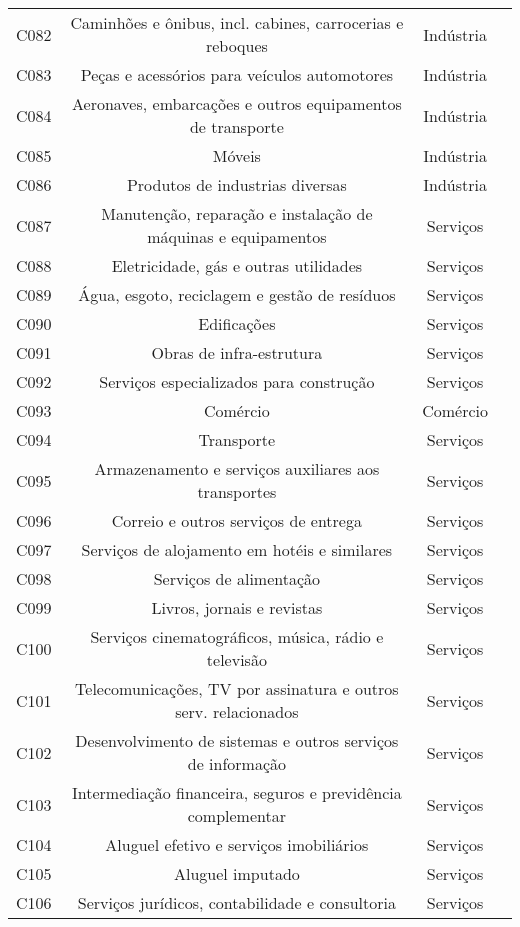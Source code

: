\begin{apendicesenv}
\begin{small}
\begin{center}
\begin{longtable}{lccc}
				C082 & Caminhões e ônibus, incl. cabines, carrocerias e reboques & Indústria \\
				C083 & Peças e acessórios para veículos automotores & Indústria \\
				C084 & Aeronaves, embarcações e outros equipamentos de transporte & Indústria \\
				C085 & Móveis & Indústria \\
				C086 & Produtos de industrias diversas & Indústria \\
				C087 & Manutenção, reparação e instalação de máquinas e equipamentos & Serviços \\
				C088 & Eletricidade, gás e outras utilidades & Serviços \\
				C089 & Água, esgoto, reciclagem e gestão de resíduos & Serviços \\
				C090 & Edificações & Serviços \\
				C091 & Obras de infra-estrutura & Serviços \\
				C092 & Serviços especializados para construção & Serviços \\
				C093 & Comércio & Comércio \\
				C094 & Transporte & Serviços \\
				C095 & Armazenamento e serviços auxiliares aos transportes & Serviços \\
				C096 & Correio e outros serviços de entrega & Serviços \\
				C097 & Serviços de alojamento em hotéis e similares & Serviços \\
				C098 & Serviços  de alimentação & Serviços \\
				C099 & Livros, jornais e revistas & Serviços \\
				C100 & Serviços cinematográficos, música, rádio e televisão & Serviços \\
				C101 & Telecomunicações, TV por assinatura e outros serv. relacionados & Serviços \\
				C102 & Desenvolvimento de sistemas e outros serviços de informação & Serviços \\
				C103 & Intermediação financeira, seguros e previdência complementar & Serviços \\
				C104 & Aluguel efetivo e serviços imobiliários & Serviços \\
				C105 & Aluguel imputado & Serviços \\
				C106 & Serviços jurídicos, contabilidade e consultoria & Serviços \\

\end{longtable}
\end{center}
\end{small}
\end{apendicesenv}
